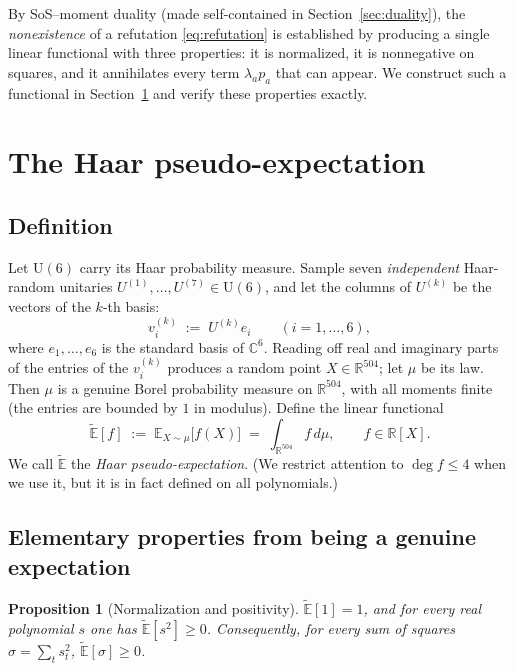\documentclass{amsart}
\newtheorem{proposition}{Proposition}
\theoremstyle{definition}
\theoremstyle{remark}
\begin{document}
By SoS--moment duality (made self-contained in Section~\ref{sec:duality}), the
\emph{nonexistence} of a refutation \eqref{eq:refutation} is established by producing a single
linear functional with three properties: it is normalized, it is nonnegative on squares, and it
annihilates every term $\lambda_a p_a$ that can appear. We construct such a functional in
Section~\ref{sec:pe} and verify these properties exactly.

\section{The Haar pseudo-expectation}\label{sec:pe}

\subsection{Definition}
Let $\mathrm{U}(6)$ carry its Haar probability measure. Sample seven \emph{independent}
Haar-random unitaries $U^{(1)},\dots,U^{(7)}\in\mathrm{U}(6)$, and let the columns of $U^{(k)}$
be the vectors of the $k$-th basis:
\begin{equation}\label{eq:sampling}
v^{(k)}_i \;:=\; U^{(k)} e_i\qquad(i=1,\dots,6),
\end{equation}
where $e_1,\dots,e_6$ is the standard basis of $\mathbb{C}^6$. Reading off real and imaginary
parts of the entries of the $v^{(k)}_i$ produces a random point $X\in\mathbb{R}^{504}$; let
$\mu$ be its law. Then $\mu$ is a genuine Borel probability measure on $\mathbb{R}^{504}$, with
all moments finite (the entries are bounded by $1$ in modulus). Define the linear functional
\begin{equation}\label{eq:Edef}
\widetilde{\mathbb{E}}[f]\;:=\;\mathbb{E}_{X\sim\mu}\bigl[f(X)\bigr]\;=\;\int_{\mathbb{R}^{504}} f\,d\mu ,
\qquad f\in\mathbb{R}[X].
\end{equation}
We call $\widetilde{\mathbb{E}}$ the \emph{Haar pseudo-expectation}. (We restrict attention to
$\deg f\le 4$ when we use it, but it is in fact defined on all polynomials.)

\subsection{Elementary properties from being a genuine expectation}

\begin{proposition}[Normalization and positivity]\label{prop:posnorm}
$\widetilde{\mathbb{E}}[1]=1$, and for every real polynomial $s$ one has
$\widetilde{\mathbb{E}}[s^2]\ge 0$. Consequently, for every sum of squares
$\sigma=\sum_t s_t^2$, $\widetilde{\mathbb{E}}[\sigma]\ge 0$.
\end{proposition}
\end{document}
